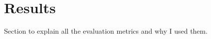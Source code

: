 
\chapter{Results}


\label{Section6}

Section to explain all the evaluation metrics and why I used them.


